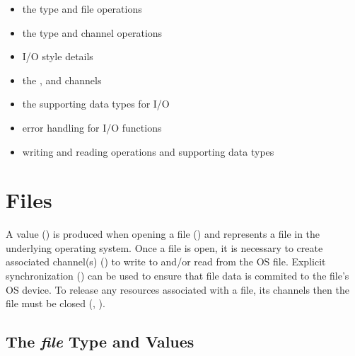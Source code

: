 \begin{itemize}

\item the  type and file operations

\item the  type and channel operations

\item I/O style details

\item the ,  and  channels

\item the supporting data types for I/O

\item error handling for I/O functions

\item writing and reading operations and supporting data types

\end{itemize}




\section{Files}
\label{IO_files}

A  value ()
is produced when opening a file ()
and represents a file in the underlying operating system.
%
Once a file is open, it is necessary to create associated channel(s)
() to write to and/or read from the OS file.
%
Explicit synchronization () can be used to ensure
that file data is commited to the file's OS device.
%
To release any resources associated with a file,
its channels then the file must be closed
(, ).


\subsection{The {\em file} Type and Values}
\label{IO_file_type}

